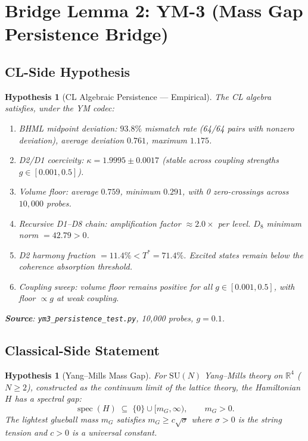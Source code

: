 \documentclass[11pt]{article}
\newtheorem{hypothesis}[lemma]{Hypothesis}
\theoremstyle{definition}
\DeclareMathOperator{\spec}{spec}
\begin{document}
\section{Bridge Lemma 2: YM-3 (Mass Gap Persistence Bridge)}

\subsection{CL-Side Hypothesis}

\begin{hypothesis}[CL Algebraic Persistence --- Empirical]
\label{hyp:cl-persistence-ym}
The CL algebra satisfies, under the YM codec:
\begin{enumerate}
  \item[(P1)] BHML midpoint deviation: $93.8\%$ mismatch rate (64/64 pairs with
    nonzero deviation), average deviation $0.761$, maximum $1.175$.
  \item[(P2)] D2/D1 coercivity: $\kappa = 1.9995 \pm 0.0017$ (stable across
    coupling strengths $g \in [0.001, 0.5]$).
  \item[(P3)] Volume floor: average $0.759$, minimum $0.291$, with
    0 zero-crossings across $10{,}000$ probes.
  \item[(P4)] Recursive D1--D8 chain: amplification factor $\approx 2.0\times$ per level.
    $D_8$ minimum norm $= 42.79 > 0$.
  \item[(P5)] D2 harmony fraction $= 11.4\% < T^* = 71.4\%$.
    Excited states remain below the coherence absorption threshold.
  \item[(P6)] Coupling sweep: volume floor remains positive for all
    $g \in [0.001, 0.5]$, with floor $\propto g$ at weak coupling.
\end{enumerate}
\textbf{Source}: \texttt{ym3\_persistence\_test.py}, 10,000 probes, $g = 0.1$.
\end{hypothesis}

\subsection{Classical-Side Statement}

\begin{hypothesis}[Yang--Mills Mass Gap]
\label{hyp:ym-classical}
For $\mathrm{SU}(N)$ Yang--Mills theory on $\mathbb{R}^4$ ($N \geq 2$),
constructed as the continuum limit of the lattice theory,
the Hamiltonian $H$ has a spectral gap:
\[
  \spec(H) \;\subseteq\; \{0\} \cup [m_G, \infty), \qquad m_G > 0.
\]
The lightest glueball mass $m_G$ satisfies $m_G \geq c\sqrt{\sigma}$ where
$\sigma > 0$ is the string tension and $c > 0$ is a universal constant.
\end{hypothesis}
\end{document}
